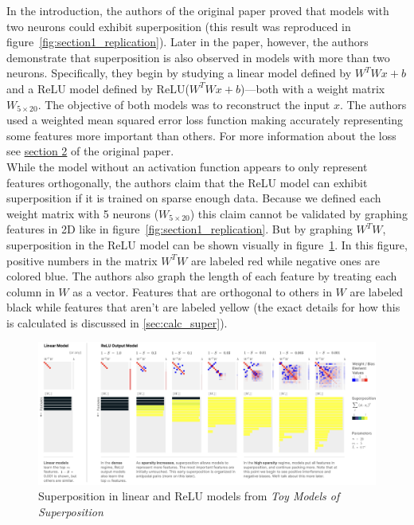 \documentclass{article} %
\begin{document}
In the introduction, the authors of the original paper proved that models with 
two neurons could exhibit superposition (this result was reproduced in figure~\ref{fig:section1_replication}).
Later in the paper, however, the authors demonstrate that superposition
is also observed in models with more than two neurons. Specifically, they begin 
by studying a linear model defined by 
$W^TWx + b$ and a ReLU model defined by ReLU($W^TWx + b$)---both with a weight matrix $W_{5 \times 20}$.
The objective of both
models was to reconstruct the input $x$. The authors used a weighted mean squared
error loss function making accurately representing some features more important
than others. For more information about the loss see 
\href{https://transformer-circuits.pub/2022/toy_model/index.html#demonstrating}{section 2} 
of the original paper.\\


While the model without an activation function appears to only represent features
orthogonally, the authors claim that the ReLU model can exhibit superposition
if it is trained on sparse enough data. Because we defined each weight matrix with 5 neurons ($W_{5 \times 20}$)
this claim cannot be validated by graphing features in 2D like in figure~\ref{fig:section1_replication}. 
But by graphing $W^TW$, superposition in the ReLU model can be shown visually in figure~\ref{fig:section3_anthropic}. 
In this figure, positive numbers in the matrix $W^TW$ are labeled red while 
negative ones are colored blue. The authors also graph the length of each feature by treating 
each column in $W$ as a vector. Features that are orthogonal to others in $W$ are 
labeled black while features that aren't are labeled yellow
(the exact details for how this is calculated is discussed in \ref{sec:calc_super}).\\

\begin{figure}[h]
    \centering
    \includegraphics[width=0.9\linewidth]{demonstrating_superposition/images/anthropic_section3.png}
    \captionsetup{font=footnotesize} %
    \caption{Superposition in linear and ReLU models from \textit{Toy Models of Superposition}\cite{elhage2022toy}}
    \label{fig:section3_anthropic}
\end{figure}
\end{document}
